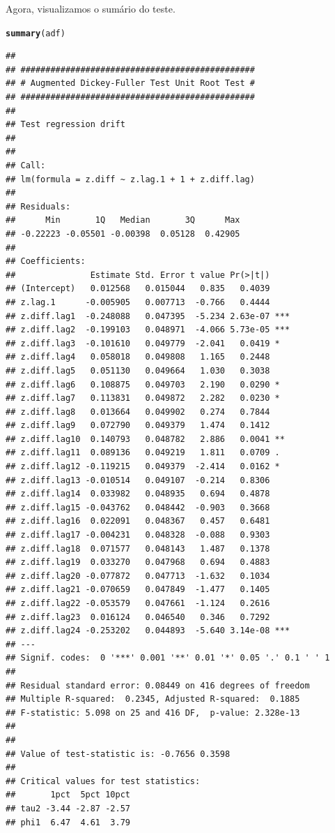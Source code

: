 \documentclass{article}\usepackage[]{graphicx}\usepackage[]{color}
\makeatletter
\newcommand{\hlstd}[1]{\textcolor[rgb]{0.345,0.345,0.345}{#1}}%
\newcommand{\hlkwd}[1]{\textcolor[rgb]{0.737,0.353,0.396}{\textbf{#1}}}%
\newenvironment{kframe}{%
 \def\at@end@of@kframe{}%
 \ifinner\ifhmode%
  \def\at@end@of@kframe{\end{minipage}}%
  \begin{minipage}{\columnwidth}%
 \fi\fi%
 \def\FrameCommand##1{\hskip\@totalleftmargin \hskip-\fboxsep
 \colorbox{shadecolor}{##1}\hskip-\fboxsep
     \hskip-\linewidth \hskip-\@totalleftmargin \hskip\columnwidth}%
 \MakeFramed {\advance\hsize-\width
   \@totalleftmargin\z@ \linewidth\hsize
   \@setminipage}}%
 {\par\unskip\endMakeFramed%
 \at@end@of@kframe}
\newenvironment{knitrout}{}{} %
\makeatother
\begin{document}
            Agora, visualizamos o sumário do teste.        
            
\begin{knitrout}
\color{fgcolor}\begin{kframe}
\begin{alltt}
\hlkwd{summary}\hlstd{(adf)}
\end{alltt}
\begin{verbatim}
## 
## ############################################### 
## # Augmented Dickey-Fuller Test Unit Root Test # 
## ############################################### 
## 
## Test regression drift 
## 
## 
## Call:
## lm(formula = z.diff ~ z.lag.1 + 1 + z.diff.lag)
## 
## Residuals:
##      Min       1Q   Median       3Q      Max 
## -0.22223 -0.05501 -0.00398  0.05128  0.42905 
## 
## Coefficients:
##               Estimate Std. Error t value Pr(>|t|)    
## (Intercept)   0.012568   0.015044   0.835   0.4039    
## z.lag.1      -0.005905   0.007713  -0.766   0.4444    
## z.diff.lag1  -0.248088   0.047395  -5.234 2.63e-07 ***
## z.diff.lag2  -0.199103   0.048971  -4.066 5.73e-05 ***
## z.diff.lag3  -0.101610   0.049779  -2.041   0.0419 *  
## z.diff.lag4   0.058018   0.049808   1.165   0.2448    
## z.diff.lag5   0.051130   0.049664   1.030   0.3038    
## z.diff.lag6   0.108875   0.049703   2.190   0.0290 *  
## z.diff.lag7   0.113831   0.049872   2.282   0.0230 *  
## z.diff.lag8   0.013664   0.049902   0.274   0.7844    
## z.diff.lag9   0.072790   0.049379   1.474   0.1412    
## z.diff.lag10  0.140793   0.048782   2.886   0.0041 ** 
## z.diff.lag11  0.089136   0.049219   1.811   0.0709 .  
## z.diff.lag12 -0.119215   0.049379  -2.414   0.0162 *  
## z.diff.lag13 -0.010514   0.049107  -0.214   0.8306    
## z.diff.lag14  0.033982   0.048935   0.694   0.4878    
## z.diff.lag15 -0.043762   0.048442  -0.903   0.3668    
## z.diff.lag16  0.022091   0.048367   0.457   0.6481    
## z.diff.lag17 -0.004231   0.048328  -0.088   0.9303    
## z.diff.lag18  0.071577   0.048143   1.487   0.1378    
## z.diff.lag19  0.033270   0.047968   0.694   0.4883    
## z.diff.lag20 -0.077872   0.047713  -1.632   0.1034    
## z.diff.lag21 -0.070659   0.047849  -1.477   0.1405    
## z.diff.lag22 -0.053579   0.047661  -1.124   0.2616    
## z.diff.lag23  0.016124   0.046540   0.346   0.7292    
## z.diff.lag24 -0.253202   0.044893  -5.640 3.14e-08 ***
## ---
## Signif. codes:  0 '***' 0.001 '**' 0.01 '*' 0.05 '.' 0.1 ' ' 1
## 
## Residual standard error: 0.08449 on 416 degrees of freedom
## Multiple R-squared:  0.2345,	Adjusted R-squared:  0.1885 
## F-statistic: 5.098 on 25 and 416 DF,  p-value: 2.328e-13
## 
## 
## Value of test-statistic is: -0.7656 0.3598 
## 
## Critical values for test statistics: 
##       1pct  5pct 10pct
## tau2 -3.44 -2.87 -2.57
## phi1  6.47  4.61  3.79
\end{verbatim}
\end{kframe}
\end{knitrout}
\end{document}
